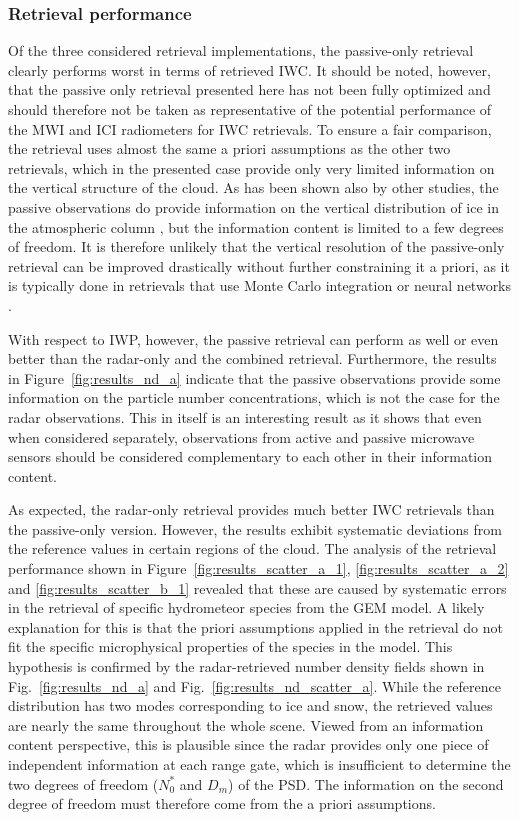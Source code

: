 \documentclass[journal abbreviation, manuscript]{copernicus}
\providecommand{\DIFadd}[1]{{\protect\color{blue}\uwave{#1}}} %
\providecommand{\DIFaddbegin}{} %
\providecommand{\DIFaddend}{} %
\begin{document}
\subsubsection{Retrieval performance}

Of the three considered retrieval implementations, the passive-only retrieval
clearly performs worst in terms of retrieved IWC. It should be noted, however,
that the passive only retrieval presented here has not been fully optimized and
should therefore not be taken as representative of the potential performance of
the MWI and ICI radiometers for IWC retrievals. To ensure a fair comparison, the
retrieval uses almost the same a priori assumptions as the other two retrievals,
which in the presented case provide only very limited information on the
vertical structure of the cloud. As has been shown also by other studies, the
passive observations do provide information on the vertical distribution of ice
in the atmospheric column \citep{wang17, grutzun18}, but the information content
is limited to a few degrees of freedom. It is therefore unlikely that the
vertical resolution of the passive-only retrieval can be improved drastically
without further constraining it a priori, as it is typically done in retrievals
that use Monte Carlo integration or neural networks \citep{pfreundschuh18}.

With respect to IWP, however, the passive retrieval can perform as well or even
better than the radar-only and the combined retrieval. Furthermore, the results
in Figure~\ref{fig:results_nd_a} indicate that the passive observations provide
some information on the particle number concentrations, which is not the case
for the radar observations. This in itself is an interesting result as it shows
that even when considered separately, observations from active and passive
microwave sensors should be considered complementary to each other in their
information content.

As expected, the radar-only retrieval provides much better IWC retrievals than
the passive-only version. However, the results exhibit systematic deviations
from the reference values in certain regions of the cloud. The analysis of the
retrieval performance shown in Figure~\ref{fig:results_scatter_a_1},
\ref{fig:results_scatter_a_2} and \ref{fig:results_scatter_b_1} revealed that
these are caused by systematic errors in the retrieval of specific hydrometeor
species from the GEM model. A likely explanation for this is that the \DIFaddbegin \DIFadd{a }\DIFaddend priori
assumptions applied in the retrieval do not fit the specific microphysical
properties of the species in the model. This hypothesis is confirmed by the
radar-retrieved number density fields shown in Fig.~\ref{fig:results_nd_a} and
Fig.~\ref{fig:results_nd_scatter_a}. While the reference distribution has two
modes corresponding to ice and snow, the retrieved values are nearly the same
throughout the whole scene. Viewed from an information content perspective, this
is plausible since the radar provides only one piece of independent information
at each range gate, which is insufficient to determine the two degrees of
freedom ($N_0^*$ and $D_m$) of the PSD. The information on the second degree of
freedom must therefore come from the a priori assumptions.
\end{document}
